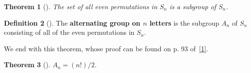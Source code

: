 \documentclass[10pt,]{book}
\newcommand{\terminology}[1]{\textbf{#1}}
\theoremstyle{plain}
\newtheorem{theorem}{Theorem}[section]
\theoremstyle{definition}
\newtheorem{definition}[theorem]{Definition}
\theoremstyle{definition}
\theoremstyle{definition}
\theoremstyle{definition}
\numberwithin{equation}{section}
\begin{document}
\begin{theorem}[{}]\label{theorem-36}
The set of all even permutations in \(S_n\) is a subgroup of \(S_n\).%
\end{theorem}
\begin{definition}[{}]\label{definition-50}
The \terminology{alternating group on \(n\) letters} is the subgroup \(A_n\) of \(S_n\) consisting of all of the  even permutations in \(S_n\).%
\end{definition}
We end with this theorem, whose proof can be found on p. 93 of~\hyperlink{F}{[1]}.%
\begin{theorem}[{}]\label{theorem-37}
\(A_n=(n!)/2\).%
\end{theorem}
\typeout{************************************************}
\typeout{************************************************}
\end{document}

